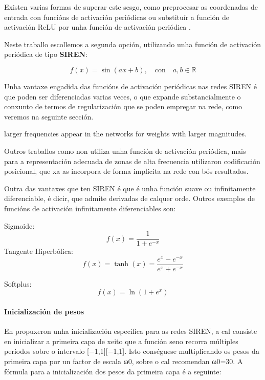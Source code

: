 Existen varias formas de superar este sesgo, como preprocesar as coordenadas de entrada con funcións de activación periódicas \cite{mildenhall2020nerfrepresentingscenesneural} 
ou substituír a función de activación ReLU por unha función de activación periódica \cite{sitzmann2020implicitneuralrepresentationsperiodic}.

Neste traballo escollemos a segunda opción, utilizando unha función de activación periódica de tipo \textbf{SIREN}:

\[
f(x) = \sin(ax + b), \quad \text{con} \quad a, b \in \mathbb{R}
\]

Unha vantaxe engadida das funcións de activación periódicas nas redes SIREN é que poden ser diferenciadas varias veces, 
o que expande substancialmente o conxunto de termos de regularización que se poden empregar na rede, como veremos na seguinte sección.

larger frequencies appear in the networks for weights with larger magnitudes.

Outros traballos como \cite{mildenhall2020nerfrepresentingscenesneural} non utiliza unha función de activación periódica, mais para a representación adecuada de zonas de alta frecuencia 
utilizaron codificación posicional, que xa as incorpora de forma implícita na rede con bós resultados. 

Outra das vantaxes que ten SIREN é que é unha función suave ou infinitamente diferenciable, é dicir, que admite derivadas de calquer orde.
Outros exemplos de funcións de activación infinitamente diferenciables son:

Sigmoide:  
\[
f(x) = \frac{1}{1 + e^{-x}}
\]
Tangente Hiperbólica:  
\[
f(x) = \tanh(x) = \frac{e^x - e^{-x}}{e^x + e^{-x}}
\]

Softplus:  
\[
f(x) = \ln(1 + e^x)
\]


\paragraph{Inicialización de pesos}

En \cite{sitzmann2020implicitneuralrepresentationsperiodic} propuxeron unha inicialización específica para as redes SIREN, 
a cal consiste en inicializar a primeira capa de xeito que a función seno recorra múltiples períodos sobre o intervalo [−1,1][−1,1].
Isto conséguese multiplicando os pesos da primeira capa por un factor de escala ω0, sobre o cal recomendan ω0=30.
A fórmula para a inicialización dos pesos da primeira capa é a seguinte:

